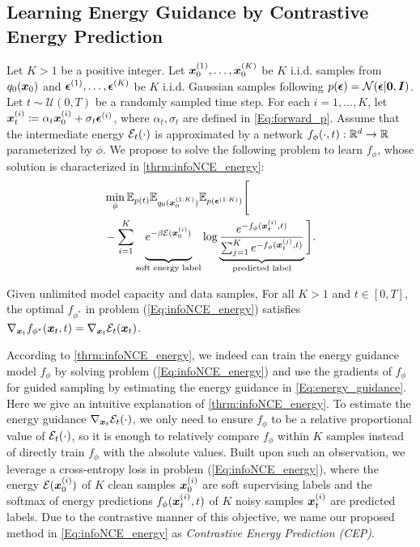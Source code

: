 \subsection{Learning Energy Guidance by Contrastive Energy Prediction}
\label{Sec:method}




Let $K>1$ be a positive integer. Let ${\bm{x}}_0^{(1)},\dots,{\bm{x}}_0^{(K)}$ be $K$ i.i.d. samples from $q_0({\bm{x}}_0)$ and $\bm{\epsilon}^{(1)},\dots,\bm{\epsilon}^{(K)}$ be $K$ i.i.d. Gaussian samples following $p(\bm{\epsilon})={\mathcal{N}}(\bm{\epsilon}|\bm{0}, {\bm{I}})$. Let $t \sim \mathcal{U}(0,T)$ be a randomly sampled time step. For each $i=1,\dots,K$, let ${\bm{x}}_t^{(i)}\coloneqq \alpha_t{\bm{x}}_0^{(i)} + \sigma_t\bm{\epsilon}^{(i)}$, where $\alpha_t,\sigma_t$ are defined in \eqref{Eq:forward_p}. Assume that the intermediate energy ${\mathcal{E}}_t(\cdot)$ is approximated by a network $f_\phi(\cdot,t):\mathbb{R}^d\rightarrow \mathbb{R}$ parameterized by $\phi$. We propose to solve the following problem to learn $f_\phi$, whose solution is characterized in \cref{thrm:infoNCE_energy}:
\begin{equation}
\label{Eq:infoNCE_energy}
\begin{split}
    &\min_\phi \E_{p(t)}\E_{q_0(\x_0^{(1:K)})}\E_{p(\epsilonv^{(1:K)})}\Bigg[ \\
    &- \sum_{i=1}^K
    \underbrace{%
        \vphantom{\frac{\exp(-f_\phi(\x_t^{(i)},t))}{\sum_{j=1}^K \exp(-f_\phi(\x_t^{(j)},t))}} 
         e^{-\beta\gE(\x_0^{(i)})}
    }_{\text{soft energy label}}
    \log \underbrace{\frac{e^{-f_\phi(\x_t^{(i)},t)}}{\sum_{j=1}^K e^{-f_\phi(\x_t^{(j)},t)}}}_{\text{predicted label}}
\Bigg].
 \end{split}
\end{equation}
\begin{theorem}
\label{thrm:infoNCE_energy}

Given unlimited model capacity and data samples, For all $K>1$ and $t\in[0,T]$, the optimal $f_{\phi^*}$ in problem (\ref{Eq:infoNCE_energy}) satisfies $\nabla_{{\bm{x}}_t}f_{\phi^*}({\bm{x}}_t,t) = \nabla_{{\bm{x}}_t}{\mathcal{E}}_t({\bm{x}}_t)$.
\end{theorem}

According to \cref{thrm:infoNCE_energy}, we indeed can train the energy guidance model $f_\phi$ by solving problem (\ref{Eq:infoNCE_energy}) and use the gradients of $f_\phi$ for guided sampling by estimating the energy guidance in \eqref{Eq:energy_guidance}.
Here we give an intuitive explanation of \cref{thrm:infoNCE_energy}. To estimate the energy guidance $\nabla_{{\bm{x}}_t}{\mathcal{E}}_t(\cdot)$, we only need to ensure $f_\phi$ to be a relative proportional value of ${\mathcal{E}}_t(\cdot)$, so it is enough to relatively compare $f_\phi$ within $K$ samples instead of directly train $f_\phi$ with the absolute values. Built upon such an observation, we leverage a cross-entropy loss in problem (\ref{Eq:infoNCE_energy}), where the energy ${\mathcal{E}}({\bm{x}}_0^{(i)})$ of $K$ clean samples ${\bm{x}}_0^{(i)}$ are soft supervising labels and the softmax of energy predictions $f_\phi({\bm{x}}_t^{(i)},t)$ of $K$ noisy samples ${\bm{x}}_t^{(i)}$ are predicted labels.
Due to the contrastive manner of this objective, we name our proposed method in \eqref{Eq:infoNCE_energy} as \textit{Contrastive Energy Prediction (CEP)}.






